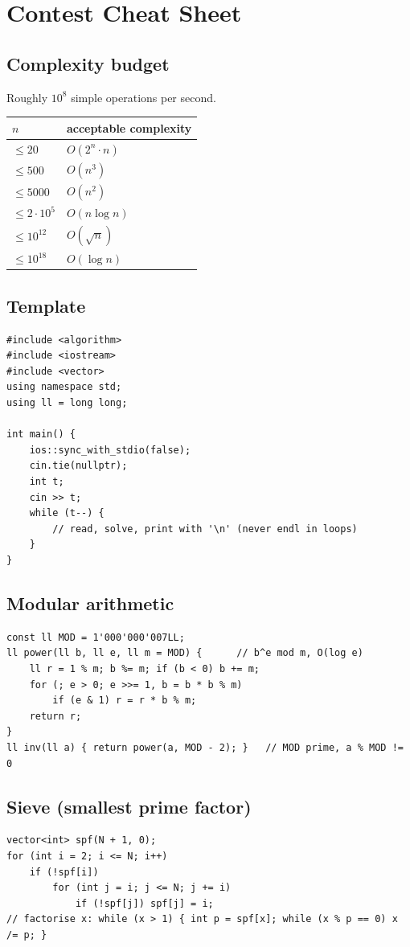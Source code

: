 \chapter{Contest Cheat Sheet}

\section*{Complexity budget}
Roughly $10^8$ simple operations per second.
\begin{center}
\begin{tabular}{ll}
\toprule
$n$ & acceptable complexity\\
\midrule
$\le20$ & $O(2^n\cdot n)$ \\
$\le500$ & $O(n^3)$ \\
$\le5000$ & $O(n^2)$ \\
$\le2\cdot10^5$ & $O(n\log n)$ \\
$\le10^{12}$ & $O(\sqrt n)$ \\
$\le10^{18}$ & $O(\log n)$ \\
\bottomrule
\end{tabular}
\end{center}

\section*{Template}
\begin{lstlisting}
#include <algorithm>
#include <iostream>
#include <vector>
using namespace std;
using ll = long long;

int main() {
    ios::sync_with_stdio(false);
    cin.tie(nullptr);
    int t;
    cin >> t;
    while (t--) {
        // read, solve, print with '\n' (never endl in loops)
    }
}
\end{lstlisting}

\section*{Modular arithmetic}
\begin{lstlisting}
const ll MOD = 1'000'000'007LL;
ll power(ll b, ll e, ll m = MOD) {      // b^e mod m, O(log e)
    ll r = 1 % m; b %= m; if (b < 0) b += m;
    for (; e > 0; e >>= 1, b = b * b % m)
        if (e & 1) r = r * b % m;
    return r;
}
ll inv(ll a) { return power(a, MOD - 2); }   // MOD prime, a % MOD != 0
\end{lstlisting}

\section*{Sieve (smallest prime factor)}
\begin{lstlisting}
vector<int> spf(N + 1, 0);
for (int i = 2; i <= N; i++)
    if (!spf[i])
        for (int j = i; j <= N; j += i)
            if (!spf[j]) spf[j] = i;
// factorise x: while (x > 1) { int p = spf[x]; while (x % p == 0) x /= p; }
\end{lstlisting}

